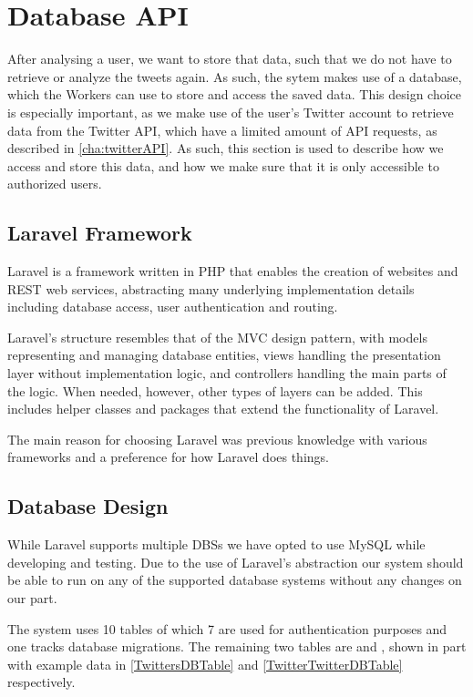 \chapter{Database \acs{API}}\label{DatabaseAPI}
After analysing a user, we want to store that data, such that we do not have to
retrieve or analyze the tweets again. As such, the sytem makes use of a
database, which the Workers can use to store and access the saved data. This
design choice is especially important, as we make use of the user's Twitter
account to retrieve data from the Twitter \ac{API}, which have a limited amount
of API requests, as described in \autoref{cha:twitterAPI}.
As such, this section is used to describe how we access and store this data, and
how we make sure that it is only accessible to authorized users.

\section{Laravel Framework}\label{sec:laravel}
Laravel is a framework written in PHP that enables the creation of websites and
\ac{REST} web services, abstracting many underlying implementation details
including database access, user authentication and routing.\nl

Laravel's structure resembles that of the \ac{MVC} design pattern, with models
representing and managing database entities, views handling the presentation
layer without implementation logic, and controllers handling the main parts of
the logic. When needed, however, other types of layers can be added. This
includes helper classes and packages that extend the functionality of
Laravel.\nl

The main reason for choosing Laravel was previous knowledge with various
frameworks and a preference for how Laravel does things.

\section{Database Design}\label{DBDesign}
While Laravel supports multiple \acp{DBS}\citep{LaravelDBS} we have opted to use
MySQL while developing and testing. Due to the use of Laravel's abstraction our
system should be able to run on any of the supported database systems without
any changes on our part.\nl

The system uses 10 tables of which 7 are used for authentication purposes and
one tracks database migrations. The remaining two tables are 
and , shown in part with example data in
\autoref{TwittersDBTable} and \autoref{TwitterTwitterDBTable} respectively.\nl

